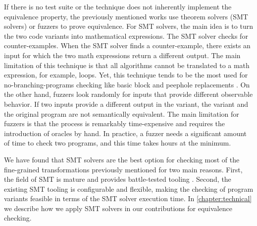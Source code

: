 If there is no test suite or the technique does not inherently implement the equivalence property, the previously mentioned works use theorem solvers (SMT solvers) \cite{SMT_solver} or fuzzers \citationneeded to prove equivalence. For SMT solvers, the main idea is to turn the two code variants into mathematical expressions. The SMT solver checks for counter-examples. When the SMT solver finds a counter-example, there exists an input for which the two math expressions return a different output. The main limitation of this technique is that all algorithms cannot be translated to a math expression, for example, loops. Yet, this technique tends to be the most used for no-branching-programs checking like basic block and peephole replacements \citationneeded.
On the other hand, fuzzers look randomly for inputs that provide different observable behavior. If two inputs provide a different output in the variant, the variant and the original program are not semantically equivalent. The main limitation for fuzzers is that the process is remarkably time-expensive and requires the introduction of oracles by hand. In practice,  a fuzzer needs a significant amount of time to check two programs, and this time takes hours at the minimum. 

We have found that SMT solvers are the best option for checking most of the fine-grained transformations previously mentioned for two main reasons. First, the field of SMT is mature and provides battle-tested tooling \cite{SMT_solver, SMTGupta}. Second, the existing SMT tooling is configurable and flexible, making the checking of program variants feasible in terms of the SMT solver execution time. In \autoref{chapter:technical} we describe how we apply SMT solvers in our contributions for equivalence checking.




